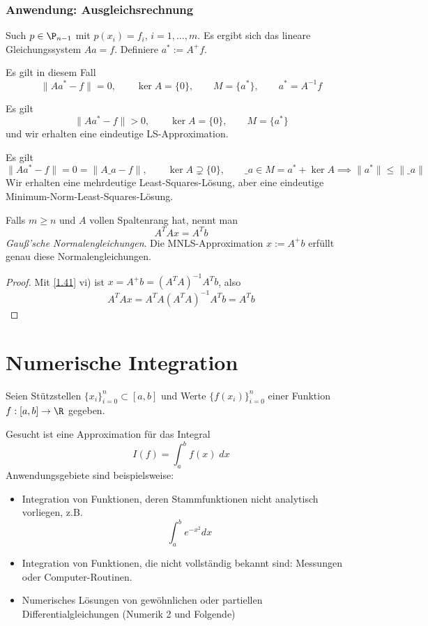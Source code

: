 \documentclass[11pt]{scrbook}
\begin{document}
\subsection{Anwendung: Ausgleichsrechnung}

Such $p\in \P_{n-1}$ mit $p(x_i)=f_i$, $i=1,\dotsc,m$.
Es ergibt sich das lineare Gleichungssystem $Aa = f$.
Definiere $a^* := A^+f$.

\begin{seg}[$m=n$ (Polynominterpolation)]
	Es gilt in diesem Fall
	\[
		\|Aa^*-f\| = 0, \qquad \ker A = \{0\}, \qquad M = \{a^*\}, \qquad a^* = A^{-1}f
	\]
\end{seg}
\begin{seg}[$m>n$]
	Es gilt
	\[
		\|Aa^*-f\| > 0, \qquad \ker A = \{0\}, \qquad M = \{a^*\}
	\]
	und wir erhalten eine eindeutige LS-Approximation.
\end{seg}
\begin{seg}[$m<n$]
	Es gilt
	\[
		\|Aa^*-f\| = 0 = \|A\_a-f\|, \qquad \ker A \supsetneq \{0\}, \qquad \_a \in M = a^* + \ker A \implies \|a^*\| \le \|\_a\|
	\]
	Wir erhalten eine mehrdeutige Least-Squares-Lösung, aber eine eindeutige Minimum-Norm-Least-Squares-Lösung.
\end{seg}
\begin{nt*}
	Falls $m\ge n$ und $A$ vollen Spaltenrang hat, nennt man
	\[
		A^TAx = A^Tb
	\]
	\emph{Gauß'sche Normalengleichungen}.
	Die MNLS-Approximation $x:=A^+b$ erfüllt genau diese Normalengleichungen.
	\begin{proof}
		Mit \ref{1.41} vi) ist $x=A^+b = (A^TA)^{-1}A^Tb$, also
		\[
			A^TAx = A^TA(A^TA)^{-1}A^T b = A^Tb
		\]
	\end{proof}
\end{nt*}



\chapter{Numerische Integration}	



Seien Stützstellen $\{x_i\}_{i=0}^n \subset [a,b]$ und Werte $\{f(x_i)\}_{i=0}^n$ einer Funktion $f:[a,b]\to \R$ gegeben.

Gesucht ist eine Approximation für das Integral
\[
	I(f) = \int_a^b f(x) \;dx
\]
Anwendungsgebiete sind beispielsweise:
\begin{itemize}
	\item
		Integration von Funktionen, deren Stammfunktionen nicht analytisch vorliegen, z.B.
		\[
			\int_a^b e^{-x^2} dx
		\]
	\item
		Integration von Funktionen, die nicht vollständig bekannt sind: Messungen oder Computer-Routinen.
	\item
		Numerisches Lösungen von gewöhnlichen oder partiellen Differentialgleichungen (Numerik 2 und Folgende)
\end{itemize}
\end{document}
